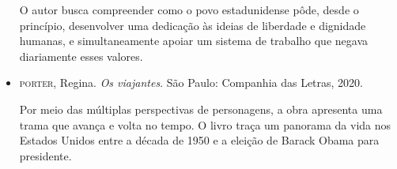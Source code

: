 \documentclass[12pt]{extarticle}
\begin{document}
\begin{itemize}
O autor busca compreender como o povo estadunidense pôde, desde o
princípio, desenvolver uma dedicação às ideias de liberdade e dignidade
humanas, e simultaneamente apoiar um sistema de trabalho que negava
diariamente esses valores.

\item\textsc{porter}, Regina. \textit{Os viajantes}. São Paulo: Companhia das
  Letras, 2020.

Por meio das múltiplas perspectivas de personagens, a obra apresenta uma
trama que avança e volta no tempo. O livro traça um panorama da vida nos
Estados Unidos entre a década de 1950 e a eleição de Barack Obama para
presidente.
\end{itemize}
\end{document}

